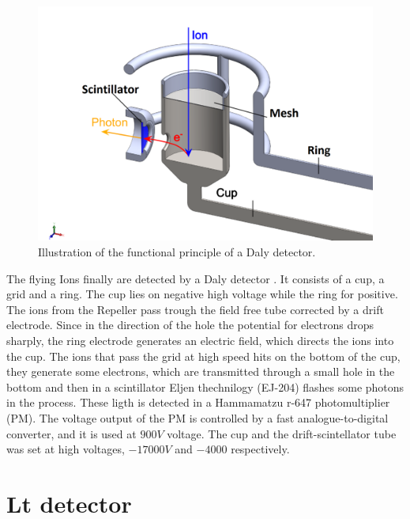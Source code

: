 \begin{figure}[hbtp]
\label{img:tofcup}
\centering
\includegraphics[width = 10 cm]{../Images/Cup scintillator.png}
\caption[TOF cup]{Illustration of the functional principle of a Daly detector.}
\end{figure}

The flying Ions finally are detected by a  Daly detector \cite{daly_scintillation_1960}. It consists of a cup, a grid and a ring. The cup lies on negative high voltage while the ring for positive. The ions from the Repeller pass trough the field free tube corrected by a drift electrode.  Since in the direction of the hole the potential for electrons drops sharply, the ring electrode generates an electric field, which directs the ions into the cup. The ions that pass the  grid at high speed hits on the bottom of the cup, they generate some electrons, which are transmitted through a small hole in the bottom and then in a scintillator Eljen thechnilogy (EJ-204) flashes some photons in the process. These ligth is detected in a Hammamatzu r-647 photomultiplier (PM). The voltage output of the PM is controlled by a fast analogue-to-digital converter, and it is used at $900V$ voltage. The cup and the drift-scintellator  tube was set at high voltages,  $-17000V$ and $-4000$ respectively.

\section{Lt detector}

